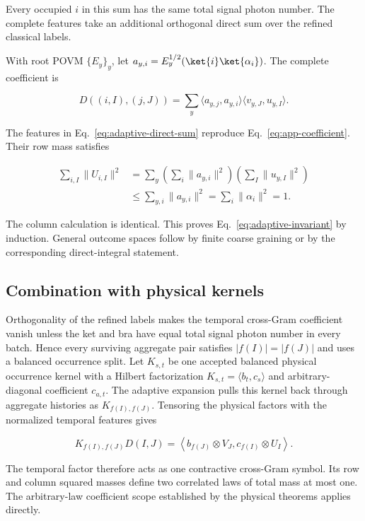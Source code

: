 Every occupied $i$ in this sum has the same total signal photon number. The complete features take an additional orthogonal direct sum over the refined classical labels.

With root POVM $\{E_y\}_y$, let $a_{y,i}=E_y^{1/2}(\ket{i}\ket{\alpha_i})$. The complete coefficient is

\begin{equation}
D((i,I),(j,J))
=\sum_y
\langle a_{y,j},a_{y,i}\rangle
\langle v_{y,J},u_{y,I}\rangle.
\label{eq:app-coefficient}
\end{equation}

The features in Eq.~\eqref{eq:adaptive-direct-sum} reproduce Eq.~\eqref{eq:app-coefficient}. Their row mass satisfies

\begin{align}
\sum_{i,I}\|U_{i,I}\|^2
&=\sum_y
\left(\sum_i\|a_{y,i}\|^2\right)
\left(\sum_I\|u_{y,I}\|^2\right)
\\
&\le\sum_{y,i}\|a_{y,i}\|^2
=\sum_i\|\alpha_i\|^2
=1.
\end{align}

The column calculation is identical. This proves Eq.~\eqref{eq:adaptive-invariant} by induction. General outcome spaces follow by finite coarse graining or by the corresponding direct-integral statement.

\subsection{Combination with physical kernels}

Orthogonality of the refined labels makes the temporal cross-Gram coefficient vanish unless the ket and bra have equal total signal photon number in every batch. Hence every surviving aggregate pair satisfies $|f(I)|=|f(J)|$ and uses a balanced occurrence split. Let $K_{s,t}$ be one accepted balanced physical occurrence kernel with a Hilbert factorization $K_{s,t}=\langle b_t,c_s\rangle$ and arbitrary-diagonal coefficient $c_{a,t}$. The adaptive expansion pulls this kernel back through aggregate histories as $K_{f(I),f(J)}$. Tensoring the physical factors with the normalized temporal features gives

\begin{equation}
K_{f(I),f(J)}D(I,J)
=\left\langle
b_{f(J)}\otimes V_J,
c_{f(I)}\otimes U_I
\right\rangle.
\end{equation}

The temporal factor therefore acts as one contractive cross-Gram symbol. Its row and column squared masses define two correlated laws of total mass at most one. The arbitrary-law coefficient scope established by the physical theorems applies directly.

